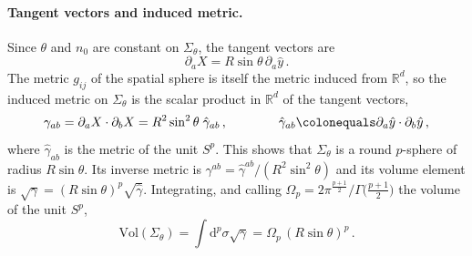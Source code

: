 \documentclass[a4paper,11pt]{article}
\newcommand{\dd}{\mathrm{d}}
\begin{document}
\paragraph{Tangent vectors and induced metric.}
Since $\theta$ and $n_0$ are constant on $\Sigma_\theta$, the tangent vectors are
\begin{equation}\label{eq:tangent}
	\partial_aX=R\sin\theta\,\partial_a\hat y\, .
\end{equation}
The metric $g_{ij}$ of the spatial sphere is itself the metric induced from $\mathbb{R}^d$, so the induced metric on $\Sigma_\theta$ is the scalar product in $\mathbb{R}^d$ of the tangent vectors,
\begin{equation}\label{eq:latmetric}
	\gamma_{ab}=\partial_aX\cdot\partial_bX=R^2\sin^2\theta\;\hat\gamma_{ab}\, ,\qquad\qquad \hat\gamma_{ab}\colonequals\partial_a\hat y\cdot\partial_b\hat y\, ,
\end{equation}
where $\hat\gamma_{ab}$ is the metric of the unit $S^p$. This shows that $\Sigma_\theta$ is a round $p$-sphere of radius $R\sin\theta$. Its inverse metric is $\gamma^{ab}=\hat\gamma^{ab}/(R^2\sin^2\theta)$ and its volume element is $\sqrt\gamma=(R\sin\theta)^p\sqrt{\hat\gamma}$. Integrating, and calling $\Omega_p=2\pi^{\frac{p+1}{2}}/\Gamma\bigl(\tfrac{p+1}{2}\bigr)$ the volume of the unit $S^p$,
\begin{equation}
	\mathrm{Vol}(\Sigma_\theta)=\int\dd^p\sigma\sqrt\gamma=\Omega_p\,(R\sin\theta)^p\, .
\end{equation}
\end{document}
